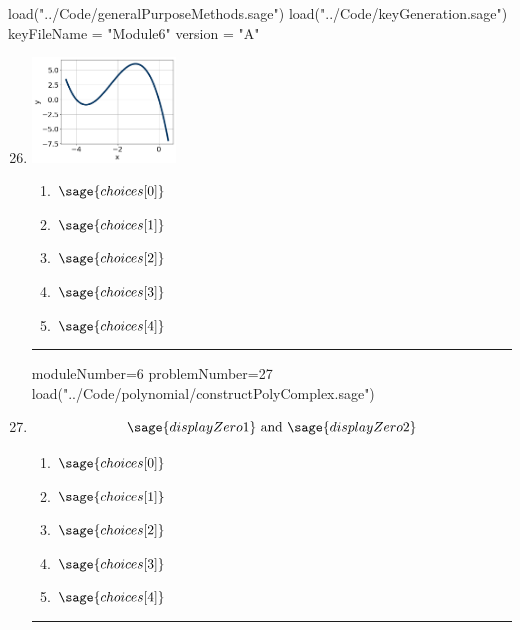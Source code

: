 \documentclass[14pt]{article}
\newcommand{\litem}[1]{\item#1\hspace*{-1cm}\rule{\textwidth}{0.4pt}}
\begin{document}
\pagestyle{fancy}

\begin{sagesilent}
load("../Code/generalPurposeMethods.sage")
load("../Code/keyGeneration.sage")
keyFileName = "Module6"
version = "A"
\end{sagesilent}

\begin{enumerate}
\setcounter{enumi}{25}


\begin{sagesilent}
moduleNumber=6
problemNumber=26
load("../Code/polynomial/polyGraphToFunction.sage")
\end{sagesilent}

\litem{ 

	\begin{center}
	\includegraphics[width = 0.3\textwidth]{../Figures/polyGraphToFunctionA.png}
	\end{center}

	\begin{enumerate}[label=\Alph*.]
		\item \( \sage{choices[0]} \)
		\item \( \sage{choices[1]} \)
		\item \( \sage{choices[2]} \)
		\item \( \sage{choices[3]} \)
		\item \( \sage{choices[4]} \)
	\end{enumerate}
}

\begin{sagesilent}
moduleNumber=6
problemNumber=27
load("../Code/polynomial/constructPolyComplex.sage")
\end{sagesilent}

\litem{	

	\[ \sage{displayZero1} \text{ and } \sage{displayZero2} \]

	\begin{enumerate}[label=\Alph*.]
		\item \( \sage{choices[0]} \)
		\item \( \sage{choices[1]} \)
		\item \( \sage{choices[2]} \)
		\item \( \sage{choices[3]} \)
		\item \( \sage{choices[4]} \)
	\end{enumerate}
}


\end{enumerate}
\end{document}
